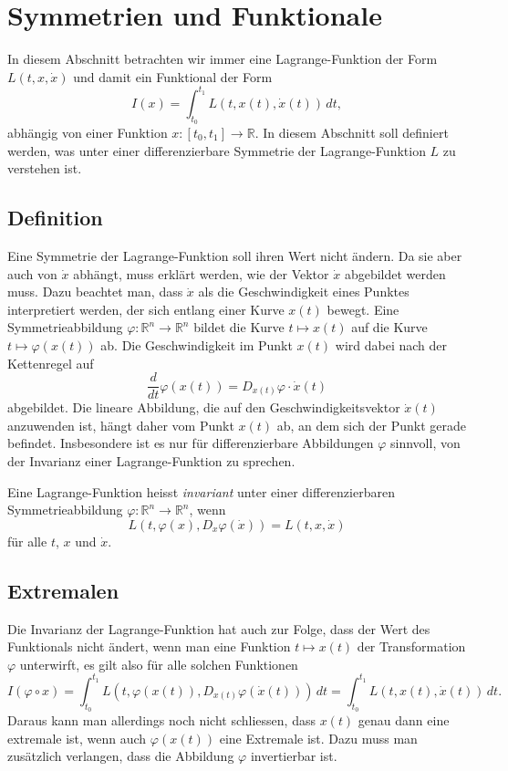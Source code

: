 %
%
%
\section{Symmetrien und Funktionale
\label{buch:symmetrien:section:symmetrie}}
In diesem Abschnitt betrachten wir immer eine Lagrange-Funktion
der Form $L(t,x,\dot{x})$ und damit ein Funktional der Form
\[
I(x)
=
\int_{t_0}^{t_1}
L(t,x(t),\dot{x}(t))\,dt,
\]
abhängig von einer Funktion $x\colon[t_0,t_1]\to\mathbb{R}$.
In diesem Abschnitt soll definiert werden, was unter einer
differenzierbare Symmetrie der Lagrange-Funktion $L$ zu verstehen
ist.

%
%
\subsection{Definition}
Eine Symmetrie der Lagrange-Funktion soll ihren Wert nicht ändern.
Da sie aber auch von $\dot{x}$ abhängt, muss erklärt werden, wie
der Vektor $\dot{x}$ abgebildet werden muss.
Dazu beachtet man, dass $\dot{x}$ als die Geschwindigkeit eines
Punktes interpretiert werden, der sich entlang einer Kurve $x(t)$
bewegt.
Eine Symmetrieabbildung $\varphi\colon\mathbb{R}^n\to\mathbb{R}^n$ 
bildet die Kurve $t\mapsto x(t)$ auf die Kurve $t\mapsto \varphi(x(t))$
ab. 
Die Geschwindigkeit im Punkt $x(t)$ wird dabei nach der Kettenregel
auf 
\[
\frac{d}{dt}\varphi(x(t))
=
D_{x(t)}\varphi\cdot \dot{x}(t)
\]
abgebildet.
Die lineare Abbildung, die auf den Geschwindigkeitsvektor $\dot{x}(t)$
anzuwenden ist, hängt daher vom Punkt $x(t)$ ab, an dem sich der
Punkt gerade befindet.
Insbesondere ist es nur für differenzierbare Abbildungen $\varphi$
sinnvoll, von der Invarianz einer Lagrange-Funktion zu sprechen.

\begin{definition}
Eine Lagrange-Funktion heisst {\em invariant} unter einer differenzierbaren
Symmetrieabbildung $\varphi\colon\mathbb{R}^n\to\mathbb{R}^n$, wenn
\[
L(t,\varphi(x), D_x\varphi(\dot{x}))
=
L(t,x,\dot{x})
\]
für alle $t$, $x$ und $\dot{x}$.
\end{definition}

%
%
\subsection{Extremalen}
Die Invarianz der Lagrange-Funktion hat auch zur Folge, dass der
Wert des Funktionals nicht ändert, wenn man eine Funktion $t\mapsto x(t)$
der Transformation $\varphi$ unterwirft, es gilt also für alle
solchen Funktionen
\[
I(\varphi\circ x)
=
\int_{t_0}^{t_1}
L(t,\varphi(x(t)),D_{x(t)}\varphi(\dot{x}(t)))
\,dt
=
\int_{t_0}^{t_1}
L(t,x(t),\dot{x}(t))
\,dt.
\]
Daraus kann man allerdings noch nicht schliessen, dass $x(t)$ genau
dann eine extremale ist, wenn auch $\varphi(x(t))$ eine Extremale ist.
Dazu muss man zusätzlich verlangen, dass die Abbildung $\varphi$
invertierbar ist.

